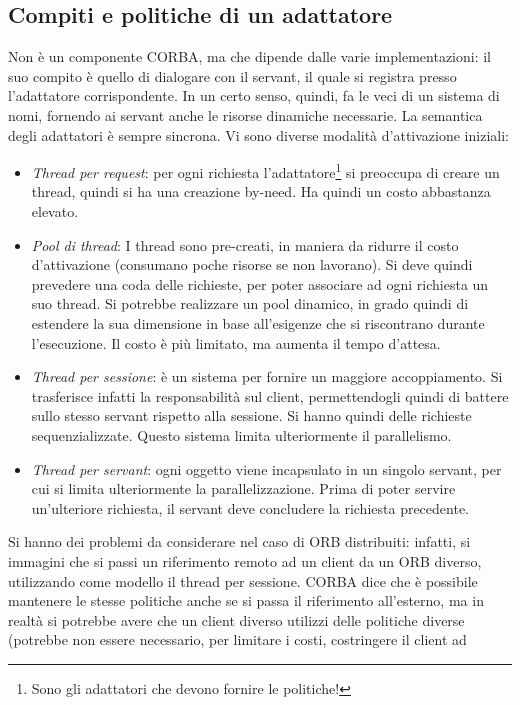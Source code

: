 \subsection{Compiti e politiche di un adattatore}
Non è un componente CORBA, ma che dipende dalle varie implementazioni: il suo compito è quello di dialogare con il 
servant, il quale si registra presso l'adattatore corrispondente. In un certo senso, quindi, fa le veci di un sistema
di nomi, fornendo ai servant anche le risorse dinamiche necessarie.
La semantica degli adattatori è sempre sincrona. Vi sono diverse modalità d'attivazione iniziali:
\begin{itemize}
 \item \textit{Thread per request}: per ogni richiesta l'adattatore\footnote{Sono gli adattatori che devono fornire le 
 politiche!} si preoccupa di creare un thread, quindi  si ha una creazione by-need. Ha quindi un costo abbastanza 
 elevato.
 \item \textit{Pool di thread}: I thread sono pre-creati, in maniera da ridurre il costo d'attivazione (consumano poche 
 risorse se non lavorano). Si deve quindi prevedere una coda delle richieste, per poter associare ad ogni richiesta un
 suo thread. Si potrebbe realizzare un pool dinamico, in grado quindi di estendere la sua dimensione in base 
 all'esigenze che si riscontrano durante l'esecuzione. Il costo è più limitato, ma aumenta il tempo d'attesa.
 \item \textit{Thread per sessione}: è un sistema per fornire un maggiore accoppiamento. Si trasferisce infatti la 
 responsabilità sul client, permettendogli quindi di battere sullo stesso servant rispetto alla sessione. Si hanno 
 quindi delle richieste sequenzializzate. Questo sistema limita ulteriormente il parallelismo.
 \item \textit{Thread per servant}: ogni oggetto viene incapsulato in un singolo servant, per cui si limita 
 ulteriormente la parallelizzazione. Prima di poter servire un'ulteriore richiesta, il servant deve concludere la 
 richiesta precedente.
\end{itemize}
Si hanno dei problemi da considerare nel caso di ORB distribuiti: infatti, si immagini che si passi un riferimento 
remoto ad un client da un ORB diverso, utilizzando come modello il thread per sessione. CORBA dice che è possibile
mantenere le stesse politiche anche se si passa il riferimento all'esterno, ma in realtà si potrebbe avere che un client 
diverso utilizzi delle politiche diverse (potrebbe non essere necessario, per limitare i costi, costringere il client ad 

